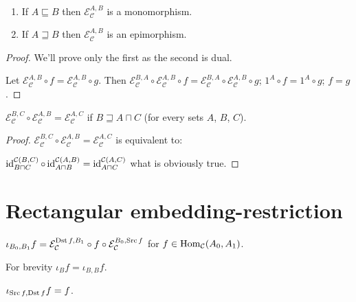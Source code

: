 \begin{prop}\label{e-mono-epi}
  ~  
  \begin{enumerate}
    \item If $A \sqsubseteq B$ then $\mathcal{E}_{\mathcal{C}}^{A,B}$ is a
    monomorphism.
    
    \item If $A \sqsupseteq B$ then $\mathcal{E}_{\mathcal{C}}^{A,B}$ is an
    epimorphism.
  \end{enumerate}
\end{prop}

\begin{proof}
  We'll prove only the first as the second is dual.
  
  Let $\mathcal{E}_{\mathcal{C}}^{A,B} \circ f = \mathcal{E}_{\mathcal{C}}^{A,B} \circ g$. Then
  $\mathcal{E}_{\mathcal{C}}^{B,A} \circ \mathcal{E}_{\mathcal{C}}^{A,B}
  \circ f = \mathcal{E}_{\mathcal{C}}^{B,A} \circ \mathcal{E}_{\mathcal{C}}^{A,B} \circ g$;
  $1^A \circ f = 1^A \circ g$; $f = g$.
\end{proof}

\begin{prop}
  $\mathcal{E}_{\mathcal{C}}^{B,C} \circ \mathcal{E}_{\mathcal{C}}^{A,B} = \mathcal{E}_{\mathcal{C}}^{A,C}$
  if $B \sqsupseteq A \sqcap C$ (for every sets $A$, $B$, $C$).
\end{prop}

\begin{proof}
  $\mathcal{E}_{\mathcal{C}}^{B,C} \circ \mathcal{E}_{\mathcal{C}}^{A,B} = \mathcal{E}_{\mathcal{C}}^{A,C}$
  is equivalent to:
  
  $\operatorname{id}^{\mathcal{C}(B,C)}_{B \sqcap C} \circ \operatorname{id}^{\mathcal{C}(A,B)}_{A \sqcap B} = \operatorname{id}^{\mathcal{C}(A,C)}_{A \sqcap C}$ what is obviously true.
\end{proof}

\section{Rectangular embedding-restriction}

\begin{defn}
  $\iota_{B_0, B_1} f = \mathcal{E}_{\mathcal{C}}^{\operatorname{Dst} f,B_1} \circ f \circ
  \mathcal{E}_{\mathcal{C}}^{B_0,\operatorname{Src} f}$ for $f \in
  \operatorname{Hom}_{\mathcal{C}} (A_0 , A_1)$.
\end{defn}

For brevity $\iota_B f = \iota_{B, B} f$.

\begin{prop}
  $\iota_{\operatorname{Src} f, \operatorname{Dst} f} f = f$.
\end{prop}


